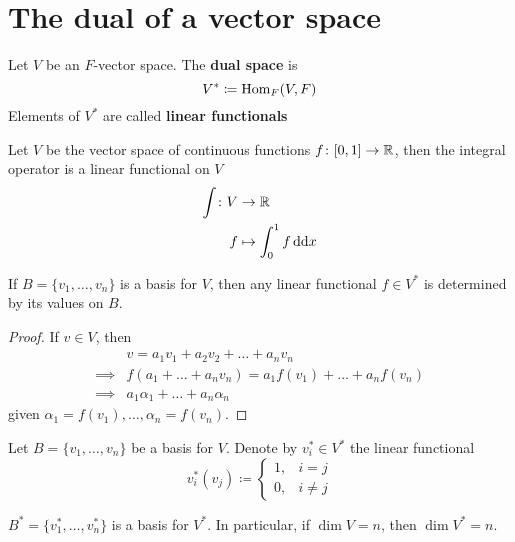 \documentclass[../Main.tex]{subfiles}
\begin{document}
\section*{The dual of a vector space}
\begin{dfn}
	Let $V$ be an $F$-vector space. The \textbf{dual space} is 
	\[V^\ast \coloneqq \operatorname{Hom}_F(V,F) \]
	Elements of $V^\ast$ are called \textbf{linear functionals}
\end{dfn}
\begin{example}
	Let $V$ be the vector space of continuous functions $f\colon [0,1] \to \mathbb{R}$, then the integral operator is a linear functional on $V$
	\begin{align*}
		\int \colon V&\to \mathbb{R} \\
		f&\mapsto \int_0^1 f\, \mathrm{dd} x
	\end{align*}
\end{example}
\begin{lem}
	If $B=\{v_1,\dots,v_n\}$ is a basis for $V$, then any linear functional $f\in V^\ast$ is determined by its values on $B$.
\end{lem}
\begin{proof}
	If $v\in V$, then 
	\begin{align*}
		&v=a_1v_1+a_2v_2+\dots+a_nv_n\\
		\implies & f(a_1+\dots+a_nv_n) = a_1f(v_1)+\dots+a_nf(v_n)\\
		\implies& a_1\alpha_1+\dots+a_n\alpha_n
	\end{align*}
	given $\alpha_1=f(v_1),\dots,\alpha_n=f(v_n)$.
\end{proof}
\begin{dfn}
	Let $B=\{v_1,\dots,v_n\}$ be a basis for $V$. Denote by $v_i^\ast \in V^\ast$ the linear functional
	\[
	v_i^\ast(v_j)\coloneqq \begin{cases}
	1,&i=j\\
	0,&i\ne j
	\end{cases}
	\]
\end{dfn}
\begin{thm}
	$B^\ast=\{v_1^\ast,\dots,v_n^\ast\}$ is a basis for $V^\ast$. In particular, if $\dim V=n$, then $\dim V^\ast=n$.
\end{thm}
\end{document}
